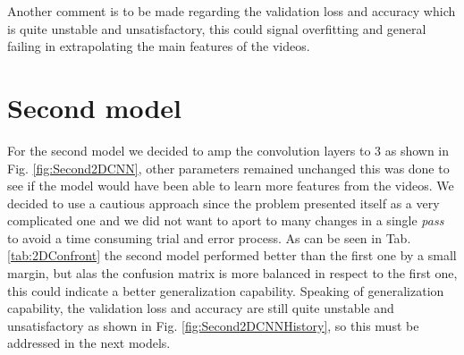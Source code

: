 Another comment is to be made regarding the validation loss and accuracy which is quite unstable and unsatisfactory, this could signal overfitting and general failing in extrapolating the main features of the videos.
\pagebreak
\section{Second model}
For the second model we decided to amp the convolution layers to 3 as shown in Fig. \ref{fig:Second2DCNN}, other parameters remained unchanged this was done to see if the model would have been able to learn more features from the videos. 
We decided to use a cautious approach since the problem presented itself as a very complicated one and we did not want to aport to many changes in a single \textit{pass} to avoid a time consuming trial and error process. As can be seen in Tab. \ref{tab:2DConfront} the second model performed better than the first one by a small margin, but alas the confusion matrix is more balanced in respect to the first one, this could indicate a better generalization capability. Speaking of generalization capability, the validation loss and accuracy are still quite unstable and unsatisfactory as shown in Fig. \ref*{fig:Second2DCNNHistory}, so this must be addressed in the next models.
\begin{table}[H]
    \centering
    \caption{Confront between the two models}
    \label{tab:2DConfront}
    \end{table}

